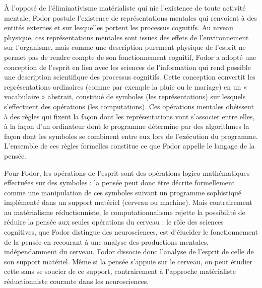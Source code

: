 
À l'opposé de l’éliminativisme matérialiste qui nie l’existence de toute activité mentale, Fodor postule l’existence de représentations mentales qui renvoient à des entités externes et sur lesquelles portent les processus cognitifs. Au niveau physique, ces représentations mentales sont issues des effets de l’environnement sur l’organisme, mais comme une description purement physique de l’esprit ne permet pas de rendre compte de son fonctionnement cognitif, Fodor a adopté une conception de l’esprit en lien avec les sciences de l’information qui rend possible une description scientifique des processus cognitifs. Cette conception convertit les représentations ordinaires (comme par exemple la pluie ou le mariage) en un « vocabulaire » abstrait, constitué de symboles (les représentations) sur lesquels s’effectuent des opérations (les computations). Ces opérations mentales obéissent à des règles qui fixent la façon dont les représentations vont s’associer entre elles, à la façon d’un ordinateur dont le programme détermine par des algorithmes la façon dont les symboles se combinent entre eux lors de l’exécution du programme. L'ensemble de ces règles formelles constitue ce que Fodor appelle le langage de la pensée.\par



Pour Fodor, les opérations de l’esprit sont des opérations logico-mathématiques effectuées sur des symboles : la pensée peut donc être décrite formellement comme une manipulation de ces symboles suivant un programme sophistiqué implémenté dans un support matériel (cerveau ou machine). Mais contrairement au matérialisme réductionniste, le computationnalisme rejette la possibilité de réduire la pensée aux seules opérations du cerveau : le rôle des sciences cognitives, que Fodor distingue des neurosciences, est d’élucider le fonctionnement de la pensée en recourant à une analyse des productions mentales, indépendamment du cerveau. Fodor dissocie donc l’analyse de l’esprit de celle de son support matériel. Même si la pensée s’appuie sur le cerveau, on peut étudier cette sans se soucier de ce support, contrairement à l’approche matérialiste réductionniste courante dans les neurosciences.\par

